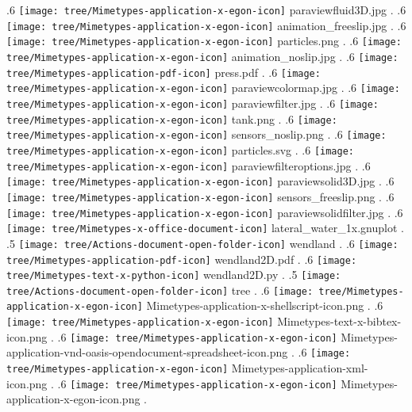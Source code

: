 {.6 { \texttt{[image: tree/Mimetypes-application-x-egon-icon]} paraviewfluid3D.jpg }.
.6 { \texttt{[image: tree/Mimetypes-application-x-egon-icon]} animation\_freeslip.jpg }.
.6 { \texttt{[image: tree/Mimetypes-application-x-egon-icon]} particles.png }.
.6 { \texttt{[image: tree/Mimetypes-application-x-egon-icon]} animation\_noslip.jpg }.
.6 { \texttt{[image: tree/Mimetypes-application-pdf-icon]} press.pdf }.
.6 { \texttt{[image: tree/Mimetypes-application-x-egon-icon]} paraviewcolormap.jpg }.
.6 { \texttt{[image: tree/Mimetypes-application-x-egon-icon]} paraviewfilter.jpg }.
.6 { \texttt{[image: tree/Mimetypes-application-x-egon-icon]} tank.png }.
.6 { \texttt{[image: tree/Mimetypes-application-x-egon-icon]} sensors\_noslip.png }.
.6 { \texttt{[image: tree/Mimetypes-application-x-egon-icon]} particles.svg }.
.6 { \texttt{[image: tree/Mimetypes-application-x-egon-icon]} paraviewfilteroptions.jpg }.
.6 { \texttt{[image: tree/Mimetypes-application-x-egon-icon]} paraviewsolid3D.jpg }.
.6 { \texttt{[image: tree/Mimetypes-application-x-egon-icon]} sensors\_freeslip.png }.
.6 { \texttt{[image: tree/Mimetypes-application-x-egon-icon]} paraviewsolidfilter.jpg }.
.6 { \texttt{[image: tree/Mimetypes-x-office-document-icon]} lateral\_water\_1x.gnuplot }.
.5 { \texttt{[image: tree/Actions-document-open-folder-icon]} wendland }.
.6 { \texttt{[image: tree/Mimetypes-application-pdf-icon]} wendland2D.pdf }.
.6 { \texttt{[image: tree/Mimetypes-text-x-python-icon]} wendland2D.py }.
.5 { \texttt{[image: tree/Actions-document-open-folder-icon]} tree }.
.6 { \texttt{[image: tree/Mimetypes-application-x-egon-icon]} Mimetypes-application-x-shellscript-icon.png }.
.6 { \texttt{[image: tree/Mimetypes-application-x-egon-icon]} Mimetypes-text-x-bibtex-icon.png }.
.6 { \texttt{[image: tree/Mimetypes-application-x-egon-icon]} Mimetypes-application-vnd-oasis-opendocument-spreadsheet-icon.png }.
.6 { \texttt{[image: tree/Mimetypes-application-x-egon-icon]} Mimetypes-application-xml-icon.png }.
.6 { \texttt{[image: tree/Mimetypes-application-x-egon-icon]} Mimetypes-application-x-egon-icon.png }.
}
